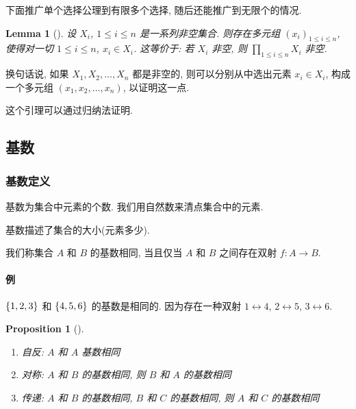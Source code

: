 \documentclass[UTF8]{ctexart}
\theoremstyle{mystyle}
\newtheorem{lemma}{Lemma}[section]
\newtheorem{proposition}{Proposition}[section]
\theoremstyle{myremark}
\theoremstyle{plain}
\DeclarePairedDelimiter\set{\{}{\}}
\begin{document}
下面推广单个选择公理到有限多个选择, 随后还能推广到无限个的情况.
\begin{lemma}[]
    设 $ X_i $, $ 1 \leqslant i \leqslant n $ 是一系列非空集合. 则存在多元组 $ (x_i)_{1 \leqslant i \leqslant n} $, 使得对一切 $ 1 \leqslant i \leqslant n $, $ x_i \in X_i $. 这等价于: 若 $ X_i $ 非空, 则 $ \displaystyle \prod_{1 \leqslant i \leqslant n} X_i $ 非空. 
\end{lemma}

换句话说, 如果 $ X_1, X_2, \dots, X_n $ 都是非空的, 则可以分别从中选出元素 $ x_i \in X_i $, 构成一个多元组 $ (x_1, x_2, \dots, x_n) $, 以证明这一点.

这个引理可以通过归纳法证明. 


\subsection{基数}
\subsubsection{基数定义}
\begin{definition}
    基数为集合中元素的个数. 我们用自然数来清点集合中的元素.
\end{definition}

基数描述了集合的大小(元素多少). 

\begin{definition}
    我们称集合 $ A $ 和 $ B $ 的基数相同, 当且仅当 $ A $ 和 $ B $ 之间存在双射 $ f \colon A \to B $.
\end{definition}

\paragraph{例}
$ \set{1, 2, 3} $ 和 $ \set{4, 5, 6} $ 的基数是相同的. 因为存在一种双射 $ 1 \leftrightarrow 4 $, $ 2 \leftrightarrow 5 $, $ 3 \leftrightarrow 6 $.

\begin{proposition}[]
    \ 
    \begin{enumerate}
        \item 自反: $ A $ 和 $ A $ 基数相同
        \item 对称: $ A $ 和 $ B $ 的基数相同, 则 $ B $ 和 $ A $ 的基数相同
        \item 传递: $ A $ 和 $ B $ 的基数相同, $ B $ 和 $ C $ 的基数相同, 则 $ A $ 和 $ C $ 的基数相同
    \end{enumerate}
\end{proposition}
\end{document}
